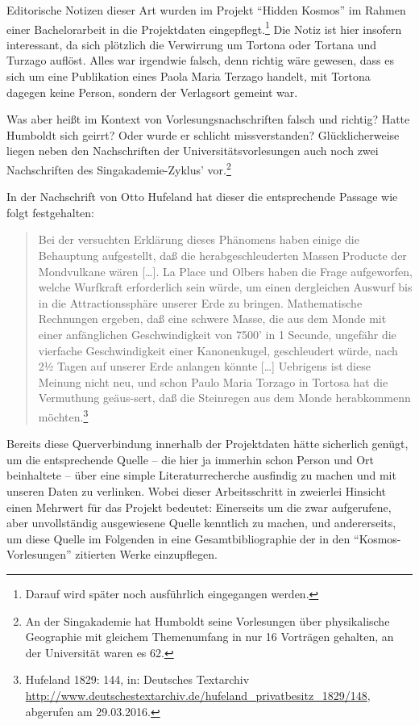 Editorische Notizen dieser Art wurden im Projekt \enquote{Hidden Kosmos}
im Rahmen einer Bachelorarbeit in die Projektdaten
eingepflegt.\footnote{Darauf wird später noch ausführlich eingegangen
  werden.} Die Notiz ist hier insofern interessant, da sich plötzlich
die Verwirrung um Tortona oder Tortana und Turzago auflöst. Alles war
irgendwie falsch, denn richtig wäre gewesen, dass es sich um eine
Publikation eines Paola Maria Terzago handelt, mit Tortona dagegen keine
Person, sondern der Verlagsort gemeint war.

Was aber heißt im Kontext von Vorlesungsnachschriften falsch und
richtig? Hatte Humboldt sich geirrt? Oder wurde er schlicht
missverstanden? Glücklicherweise liegen neben den Nachschriften der
Universitätsvorlesungen auch noch zwei Nachschriften des
Singakademie-Zyklus' vor.\footnote{An der Singakademie hat Humboldt
  seine Vorlesungen über physikalische Geographie mit gleichem
  Themenumfang in nur 16 Vorträgen gehalten, an der Universität waren es
  62.}

In der Nachschrift von Otto Hufeland hat dieser die entsprechende
Passage wie folgt festgehalten:

\begin{quote}
Bei der versuchten Erklärung dieses Phänomens haben einige die
Behauptung aufgestellt, daß die herabgeschleuderten Massen Producte der
Mondvulkane wären {[}\ldots{}{]}. La Place und Olbers haben die Frage
aufgeworfen, wel\-che Wurfkraft erforderlich sein würde, um einen
dergleichen Auswurf bis in die Attractionssphäre unserer Erde zu
bringen. Mathematische Rechnungen ergeben, daß eine schwere Masse, die
aus dem Monde mit einer anfänglichen Geschwindigkeit von 7500' in 1
Secunde, ungefähr die vierfache Geschwindigkeit einer Kanonenkugel,
geschleudert würde, nach 2½ Tagen auf unserer Erde anlangen könnte
{[}\ldots{}{]} Uebrigens ist diese Meinung nicht neu, und schon Paulo
Maria Torzago in Tortosa hat die Vermuthung geäus-sert, daß die
Steinregen aus dem Monde herabkommenn möchten.\footnote{Hufeland 1829:
  144, in: Deutsches Textarchiv
  \url{http://www.deutschestextarchiv.de/hufeland_privatbesitz_1829/148},
  abgerufen am 29.03.2016.}
\end{quote}

Bereits diese Querverbindung innerhalb der Projektdaten hätte sicherlich
ge\-nügt, um die entsprechende Quelle -- die hier ja immerhin schon Person
und Ort beinhaltete -- über eine simple Literaturrecherche ausfindig zu
machen und mit unseren Daten zu verlinken. Wobei dieser Arbeitsschritt
in zweierlei Hinsicht einen Mehrwert für das Projekt bedeutet:
Einerseits um die zwar aufgerufene, aber unvollständig ausgewiesene
Quelle kenntlich zu machen, und andererseits, um diese Quelle im
Folgenden in eine Gesamtbibliographie der in den
\enquote{Kosmos-Vorlesungen} zitierten Werke einzupflegen.

